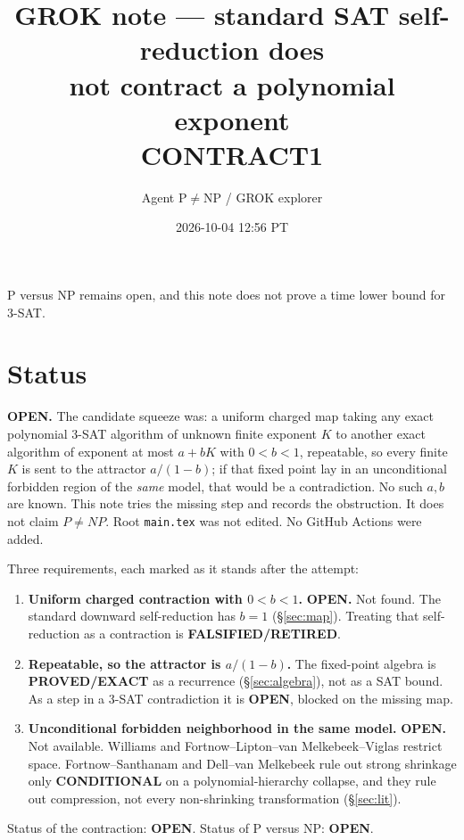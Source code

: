 \documentclass[11pt]{article}
\title{GROK note --- standard SAT self-reduction does\\not contract a polynomial exponent\\[0.25em]
\large CONTRACT1}
\author{Agent P$\neq$NP / GROK explorer}
\date{2026-10-04 12:56 PT}
\begin{document}
\maketitle

P versus NP remains open, and this note does not prove a time lower bound for 3-SAT.

\section*{Status}
\textbf{OPEN.} The candidate squeeze was: a uniform charged map taking any exact polynomial 3-SAT algorithm of unknown finite exponent $K$ to another exact algorithm of exponent at most $a+bK$ with $0<b<1$, repeatable, so every finite $K$ is sent to the attractor $a/(1-b)$; if that fixed point lay in an unconditional forbidden region of the \emph{same} model, that would be a contradiction. No such $a,b$ are known. This note tries the missing step and records the obstruction. It does not claim $P\neq NP$. Root \texttt{main.tex} was not edited. No GitHub Actions were added.

Three requirements, each marked as it stands after the attempt:
\begin{enumerate}
\item \textbf{Uniform charged contraction with $0<b<1$.} \textbf{OPEN.} Not found. The standard downward self-reduction has $b=1$ (\S\ref{sec:map}). Treating that self-reduction as a contraction is \textbf{FALSIFIED/RETIRED}.
\item \textbf{Repeatable, so the attractor is $a/(1-b)$.} The fixed-point algebra is \textbf{PROVED/EXACT} as a recurrence (\S\ref{sec:algebra}), not as a SAT bound. As a step in a 3-SAT contradiction it is \textbf{OPEN}, blocked on the missing map.
\item \textbf{Unconditional forbidden neighborhood in the same model.} \textbf{OPEN.} Not available. Williams and Fortnow--Lipton--van Melkebeek--Viglas restrict space. Fortnow--Santhanam and Dell--van Melkebeek rule out strong shrinkage only \textbf{CONDITIONAL} on a polynomial-hierarchy collapse, and they rule out compression, not every non-shrinking transformation (\S\ref{sec:lit}).
\end{enumerate}
Status of the contraction: \textbf{OPEN}. Status of P versus NP: \textbf{OPEN}.
\end{document}
